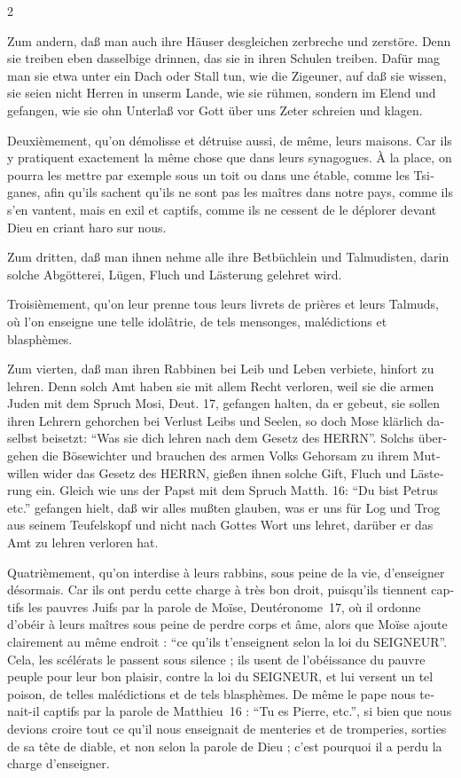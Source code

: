 \documentclass[a4paper,12pt]{article}
\newcommand\chunks[2]{%
\begin{leftcolumn*}\begin{otherlanguage}{german}%
{#1}%
\end{otherlanguage}\end{leftcolumn*}%
\begin{rightcolumn}\begin{otherlanguage}{french}%
{#2}%
\end{otherlanguage}\end{rightcolumn}%
}
\begin{document}
\begin{paracol}{2}
  \chunks{Zum andern, daß man auch ihre Häuser desgleichen zerbreche und zerstöre. Denn sie treiben eben dasselbige drinnen, das sie in ihren Schulen treiben. Dafür mag man sie etwa unter ein Dach oder Stall tun, wie die Zigeuner, auf daß sie wissen, sie seien nicht Herren in unserm Lande, wie sie rühmen, sondern im Elend und gefangen, wie sie ohn Unterlaß vor Gott über uns Zeter schreien und klagen.}
         {Deuxièmement, qu’on démolisse et détruise aussi, de même, leurs maisons. Car ils y pratiquent exactement la même chose que dans leurs synagogues. À la place, on pourra les mettre par exemple sous un toit ou dans une étable, comme les Tsiganes, afin qu’ils sachent qu’ils ne sont pas les maîtres dans notre pays, comme ils s’en vantent, mais en exil et captifs, comme ils ne cessent de le déplorer devant Dieu en criant haro sur nous.}
  \chunks{Zum dritten, daß man ihnen nehme alle ihre Betbüchlein und Talmudisten, darin solche Abgötterei, Lügen, Fluch und Lästerung gelehret wird.}
         {Troisièmement, qu’on leur prenne tous leurs livrets de prières et leurs Talmuds, où l’on enseigne une telle idolâtrie, de tels mensonges, malédictions et blasphèmes.}
  \chunks{Zum vierten, daß man ihren Rabbinen bei Leib und Leben verbiete, hinfort zu lehren. Denn solch Amt haben sie mit allem Recht verloren, weil sie die armen Juden mit dem Spruch Mosi, Deut. 17, gefangen halten, da er gebeut, sie sollen ihren Lehrern gehorchen bei Verlust Leibs und Seelen, so doch Mose klärlich daselbst beisetzt: \enquote{Was sie dich lehren nach dem Gesetz des HERRN}. Solchs übergehen die Bösewichter und brauchen des armen Volks Gehorsam zu ihrem Mutwillen wider das Gesetz des HERRN, gießen ihnen solche Gift, Fluch und Lästerung ein. Gleich wie uns der Papst mit dem Spruch Matth. 16: \enquote{Du bist Petrus etc.} gefangen hielt, daß wir alles mußten glauben, was er uns für Log und Trog aus seinem Teufelskopf und nicht nach Gottes Wort uns lehret, darüber er das Amt zu lehren verloren hat.}
         {Quatrièmement, qu’on interdise à leurs rabbins, sous peine de la vie, d’enseigner désormais. Car ils ont perdu cette charge à très bon droit, puisqu’ils tiennent captifs les pauvres Juifs par la parole de Moïse, Deutéronome~17, où il ordonne d’obéir à leurs maîtres sous peine de perdre corps et âme, alors que Moïse ajoute clairement au même endroit : \enquote{ce qu’ils t’enseignent selon la loi du SEIGNEUR}. Cela, les scélérats le passent sous silence ; ils usent de l’obéissance du pauvre peuple pour leur bon plaisir, contre la loi du SEIGNEUR, et lui versent un tel poison, de telles malédictions et de tels blasphèmes. De même le pape nous tenait-il captifs par la parole de Matthieu~16 : \enquote{Tu es Pierre, etc.}, si bien que nous devions croire tout ce qu’il nous enseignait de menteries et de tromperies, sorties de sa tête de diable, et non selon la parole de Dieu ; c’est pourquoi il a perdu la charge d’enseigner.}

\end{paracol}
\end{document}
